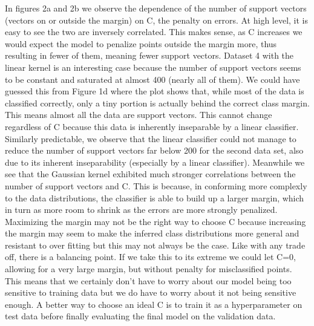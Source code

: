 \documentclass{article}
\begin{document}
In figures 2a and 2b we observe the dependence of the number of support vectors (vectors on or outside the margin) on C, the penalty on errors. At  high level, it is easy to see the two are inversely correlated. This makes sense, as C increases we would expect the model to penalize points outside the margin more, thus resulting in fewer of them, meaning fewer support vectors. Dataset 4 with the linear kernel is an interesting case because the number of support vectors seems to be constant and saturated at almost 400 (nearly all of them). We could have guessed this from Figure 1d where the plot shows that, while most of the data is classified correctly, only a tiny portion is actually behind the correct class margin. This means almost all the data are support vectors. This cannot change regardless of C because this data is inherently inseparable by a linear classifier. Similarly predictable, we observe that the linear classifier could not manage to reduce the number of support vectors far below 200 for the second data set, also due to its inherent inseparability (especially by a linear classifier). Meanwhile we see that the Gaussian kernel exhibited much stronger correlations between the number of support vectors and C. This is because, in conforming more complexly to the data distributions, the classifier is able to build up a larger margin, which in turn as more room to shrink as the errors are more strongly penalized. \\ 
Maximizing the margin may not be the right way to choose C because increasing the margin may seem to make the inferred class distributions more general and resistant to over fitting but this may not always be the case. Like with any trade off, there is a balancing point. If we take this to its extreme we could let C=0, allowing for a very large margin, but without penalty for misclassified points. This means that we certainly don't have to worry about our model being too sensitive to training data but we do have to worry about it not being sensitive enough. A better way to choose an ideal C is to train it as a hyperparameter on test data before finally evaluating the final model on the validation data.\\
\end{document}
